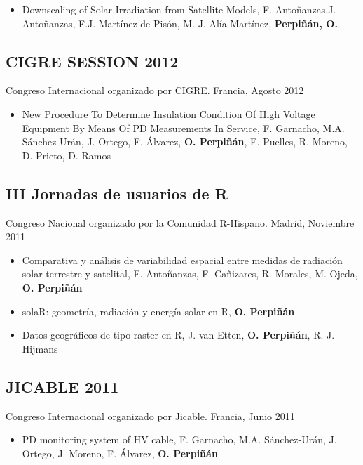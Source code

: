 \documentclass[article, a4paper]{memoir}
\begin{document}
\begin{itemize}
\item Downscaling of Solar Irradiation from Satellite Models, F. Antoñanzas,J. Antoñanzas, F.J. Martínez de Pisón, M. J. Alía Martínez, \textbf{Perpiñán, O.}
\end{itemize}
\subsection{CIGRE SESSION 2012}
\label{sec:org467dc06}
Congreso Internacional organizado por CIGRE. Francia, Agosto 2012

\begin{itemize}
\item New Procedure To Determine Insulation Condition Of High Voltage Equipment By Means Of PD Measurements In Service, F. Garnacho, M.A. Sánchez-Urán, J. Ortego, F. Álvarez, \textbf{O. Perpiñán}, E. Puelles, R. Moreno, D. Prieto, D. Ramos
\end{itemize}

\subsection{III Jornadas de usuarios de R}
\label{sec:org222dbff}
Congreso Nacional organizado por la Comunidad R-Hispano. Madrid, Noviembre 2011

\begin{itemize}
\item Comparativa y análisis de variabilidad espacial entre medidas de radiación solar terrestre y satelital, F. Antoñanzas, F. Cañizares, R. Morales, M. Ojeda, \textbf{O. Perpiñán}

\item solaR: geometría, radiación y energía solar en R, \textbf{O. Perpiñán}

\item Datos geográficos de tipo raster en R, J. van Etten, \textbf{O. Perpiñán}, R. J. Hijmans
\end{itemize}

\subsection{JICABLE 2011}
\label{sec:org3bfb3aa}
Congreso Internacional organizado por Jicable. Francia, Junio 2011

\begin{itemize}
\item PD monitoring system of HV cable, F. Garnacho, M.A. Sánchez-Urán, J. Ortego, J. Moreno, F. Álvarez, \textbf{O. Perpiñán}
\end{itemize}
\end{document}
